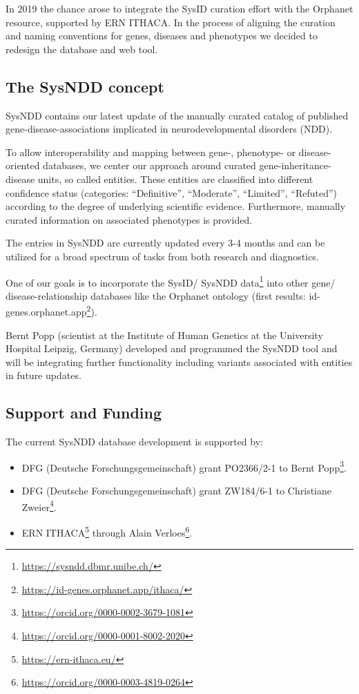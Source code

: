 \documentclass[
]{article}
\providecommand{\tightlist}{%
  \setlength{\itemsep}{0pt}\setlength{\parskip}{0pt}}
\renewcommand{\href}[2]{#2\footnote{\url{#1}}}
\begin{document}
In 2019 the chance arose to integrate the SysID curation effort with the Orphanet resource, supported by ERN ITHACA. In the process of aligning the curation and naming conventions for genes, diseases and phenotypes we decided to redesign the database and web tool.

\hypertarget{the-sysndd-concept}{%
\subsection*{The SysNDD concept}\label{the-sysndd-concept}}

SysNDD contains our latest update of the manually curated catalog of published gene-disease-associations implicated in neurodevelopmental disorders (NDD).

To allow interoperability and mapping between gene-, phenotype- or disease-oriented databases, we center our approach around curated gene-inheritance-disease units, so called entities. These entities are classified into different confidence status (categories: ``Definitive'', ``Moderate'', ``Limited'', ``Refuted'') according to the degree of underlying scientific evidence. Furthermore, manually curated information on associated phenotypes is provided.

The entries in SysNDD are currently updated every 3-4 months and can be utilized for a broad spectrum of tasks from both research and diagnostics.

One of our goals is to incorporate the SysID/ \href{https://sysndd.dbmr.unibe.ch/}{SysNDD data} into other gene/ disease-relationship databases like the Orphanet ontology (first results: \href{https://id-genes.orphanet.app/ithaca/}{id-genes.orphanet.app}).

Bernt Popp (scientist at the Institute of Human Genetics at the University Hospital Leipzig, Germany) developed and programmed the SysNDD tool and will be integrating further functionality including variants associated with entities in future updates.

\hypertarget{support-and-funding}{%
\subsection*{Support and Funding}\label{support-and-funding}}

The current SysNDD database development is supported by:

\begin{itemize}
\tightlist
\item
  DFG (Deutsche Forschungsgemeinschaft) grant PO2366/2-1 to \href{https://orcid.org/0000-0002-3679-1081}{Bernt Popp}.
\item
  DFG (Deutsche Forschungsgemeinschaft) grant ZW184/6-1 to \href{https://orcid.org/0000-0001-8002-2020}{Christiane Zweier}.
\item
  \href{https://ern-ithaca.eu/}{ERN ITHACA} through \href{https://orcid.org/0000-0003-4819-0264}{Alain Verloes}.
\end{itemize}
\end{document}
